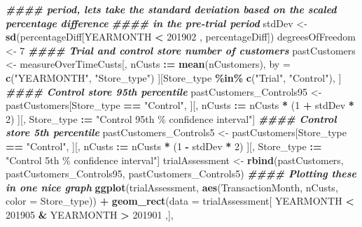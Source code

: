 \documentclass[
]{article}
\newenvironment{Shaded}{\begin{snugshade}}{\end{snugshade}}
\newcommand{\AttributeTok}[1]{\textcolor[rgb]{0.13,0.29,0.53}{#1}}
\newcommand{\DecValTok}[1]{\textcolor[rgb]{0.00,0.00,0.81}{#1}}
\newcommand{\DocumentationTok}[1]{\textcolor[rgb]{0.56,0.35,0.01}{\textbf{\textit{#1}}}}
\newcommand{\FunctionTok}[1]{\textcolor[rgb]{0.13,0.29,0.53}{\textbf{#1}}}
\newcommand{\NormalTok}[1]{#1}
\newcommand{\OtherTok}[1]{\textcolor[rgb]{0.56,0.35,0.01}{#1}}
\newcommand{\SpecialCharTok}[1]{\textcolor[rgb]{0.81,0.36,0.00}{\textbf{#1}}}
\newcommand{\StringTok}[1]{\textcolor[rgb]{0.31,0.60,0.02}{#1}}
\begin{document}
\begin{Shaded}
\begin{Highlighting}[]
\DocumentationTok{\#\#\#\# period, let\textquotesingle{}s take the standard deviation based on the scaled percentage difference}
\DocumentationTok{\#\#\#\# in the pre{-}trial period}
\NormalTok{stdDev }\OtherTok{\textless{}{-}} \FunctionTok{sd}\NormalTok{(percentageDiff[YEARMONTH }\SpecialCharTok{\textless{}} \DecValTok{201902}\NormalTok{ , percentageDiff])}
\NormalTok{degreesOfFreedom }\OtherTok{\textless{}{-}} \DecValTok{7}
\DocumentationTok{\#\#\#\# Trial and control store number of customers}
\NormalTok{pastCustomers }\OtherTok{\textless{}{-}}\NormalTok{ measureOverTimeCusts[, nCusts }\SpecialCharTok{:=} \FunctionTok{mean}\NormalTok{(nCustomers), by }\OtherTok{=}
\FunctionTok{c}\NormalTok{(}\StringTok{"YEARMONTH"}\NormalTok{, }\StringTok{"Store\_type"}\NormalTok{)}
\NormalTok{                              ][Store\_type }\SpecialCharTok{\%in\%} \FunctionTok{c}\NormalTok{(}\StringTok{"Trial"}\NormalTok{, }\StringTok{"Control"}\NormalTok{), ]}
\DocumentationTok{\#\#\#\# Control store 95th percentile}
\NormalTok{pastCustomers\_Controls95 }\OtherTok{\textless{}{-}}\NormalTok{ pastCustomers[Store\_type }\SpecialCharTok{==} \StringTok{"Control"}\NormalTok{,}
\NormalTok{                                ][, nCusts }\SpecialCharTok{:=}\NormalTok{ nCusts }\SpecialCharTok{*}\NormalTok{ (}\DecValTok{1} \SpecialCharTok{+}\NormalTok{ stdDev }\SpecialCharTok{*} \DecValTok{2}\NormalTok{)}
\NormalTok{                                ][, Store\_type }\SpecialCharTok{:=} \StringTok{"Control 95th \% confidence}
\StringTok{interval"}\NormalTok{]}
\DocumentationTok{\#\#\#\# Control store 5th percentile}
\NormalTok{pastCustomers\_Controls5 }\OtherTok{\textless{}{-}}\NormalTok{ pastCustomers[Store\_type }\SpecialCharTok{==} \StringTok{"Control"}\NormalTok{,}
\NormalTok{                              ][, nCusts }\SpecialCharTok{:=}\NormalTok{ nCusts }\SpecialCharTok{*}\NormalTok{ (}\DecValTok{1} \SpecialCharTok{{-}}\NormalTok{ stdDev }\SpecialCharTok{*} \DecValTok{2}\NormalTok{)}
\NormalTok{                              ][, Store\_type }\SpecialCharTok{:=} \StringTok{"Control 5th \% confidence}
\StringTok{interval"}\NormalTok{]}
\NormalTok{trialAssessment }\OtherTok{\textless{}{-}} \FunctionTok{rbind}\NormalTok{(pastCustomers, pastCustomers\_Controls95,}
\NormalTok{pastCustomers\_Controls5)}
\DocumentationTok{\#\#\#\# Plotting these in one nice graph}
\FunctionTok{ggplot}\NormalTok{(trialAssessment, }\FunctionTok{aes}\NormalTok{(TransactionMonth, nCusts, }\AttributeTok{color =}\NormalTok{ Store\_type)) }\SpecialCharTok{+}
  \FunctionTok{geom\_rect}\NormalTok{(}\AttributeTok{data =}\NormalTok{ trialAssessment[ YEARMONTH }\SpecialCharTok{\textless{}} \DecValTok{201905} \SpecialCharTok{\&}\NormalTok{ YEARMONTH }\SpecialCharTok{\textgreater{}} \DecValTok{201901}\NormalTok{ ,],}

\end{Highlighting}
\end{Shaded}
\end{document}
